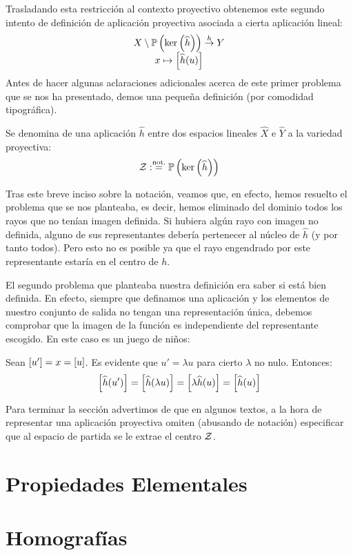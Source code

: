 Trasladando esta restricción al contexto proyectivo obtenemos este segundo intento de definición de aplicación proyectiva asociada a cierta aplicación lineal:
\[\begin{array}{c}
X\setminus\mathbb{P}\left(\ker\left(\widehat{h}\right)\right)\stackrel{h}{\to}Y\\
x\mapsto\left [ \widehat{h}(u) \right ]
\end{array}\]
Antes de hacer algunas aclaraciones adicionales acerca de este primer problema que se nos ha presentado, demos una pequeña definición (por comodidad tipográfica).
\begin{defi}[Centro]
	\label{C4_def_centro}
	Se denomina  de una aplicación $\widehat{h}$ entre dos espacios lineales $\widehat{X}$ e $\widehat{Y}$ a la variedad proyectiva:
	\[\mathcal{Z}:\stackrel{\textrm{not.}}{=}\mathbb{P}\left(\ker\left(\widehat{h}\right)\right)\]
\end{defi}
Tras este breve inciso sobre la notación, veamos que, en efecto, hemos resuelto el problema que se nos planteaba, es decir, hemos eliminado del dominio todos los rayos que no tenían imagen definida. Si hubiera algún rayo con imagen no definida, alguno de sus representantes debería pertenecer al núcleo de $\widehat{h}$ (y por tanto todos). Pero esto no es posible ya que el rayo engendrado por este representante estaría en el centro de $h$.

El segundo problema que planteaba nuestra definición era saber si está bien definida. En efecto, siempre que definamos una aplicación y los elementos de nuestro conjunto de salida no tengan una representación única, debemos comprobar que la imagen de la función es independiente del representante escogido. En este caso es un juego de niños:

Sean $\left [ u' \right ]=x=\left [ u \right ]$. Es evidente que $u' = \lambda u$ para cierto $\lambda$ no nulo. Entonces:
\[\left [ \widehat{h}(u') \right ]=\left [ \widehat{h}(\lambda u) \right ]=\left [ \lambda\widehat{h}(u) \right ]=\left [ \widehat{h}(u) \right ]\]

Para terminar la sección advertimos de que en algunos textos, a la hora de representar una aplicación proyectiva omiten (abusando de notación) especificar que al espacio de partida se le extrae el centro $\mathcal{Z}$. 
\section{Propiedades Elementales}
\section{Homografías}
